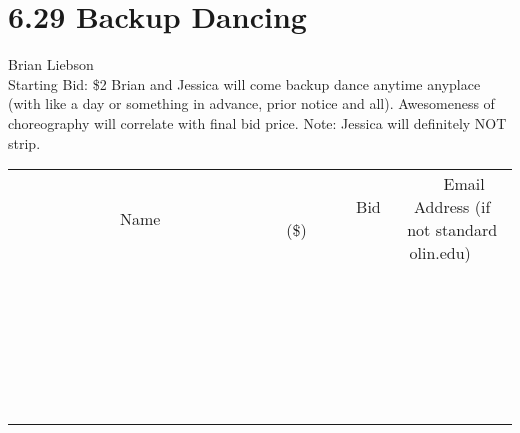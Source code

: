 \documentclass[11pt]{article}
\begin{document}
\section*{6.29 Backup Dancing}
Brian Liebson
\\
Starting Bid: \$2
\newline
Brian and Jessica will come backup dance anytime anyplace (with like a day or something in advance, prior notice and all). Awesomeness of choreography will correlate with final bid price. Note: Jessica will definitely NOT strip.
\\[6ex]
\begin{tabular}{c c c}
~~~~~~~~~~~~~Name~~~~~~~~~~~~~ & ~~~~~~~~~Bid (\$)~~~~~~~~~  & ~~~Email Address (if not standard olin.edu)~~~\\
 & & \\
\hline
 & & \\
\hline
 & & \\
\hline
 & & \\
\hline
 & & \\
\hline
 & & \\
\hline
 & & \\
\hline
 & & \\
\hline
 & & \\
\hline
 & & \\
\hline
 & & \\
\hline
 & & \\
\hline
 & & \\
\hline
 & & \\
\hline
 & & \\
\hline
 & & \\
\hline
 & & \\
\hline
 & & \\
\hline
 & & \\
\hline
 & & \\
\hline
 & & \\
\hline
 & & \\
\hline
 & & \\
\hline
 & & \\
\hline
 & & \\
\hline
 & & \\
\hline
\end{tabular}
\newpage
\end{document}

